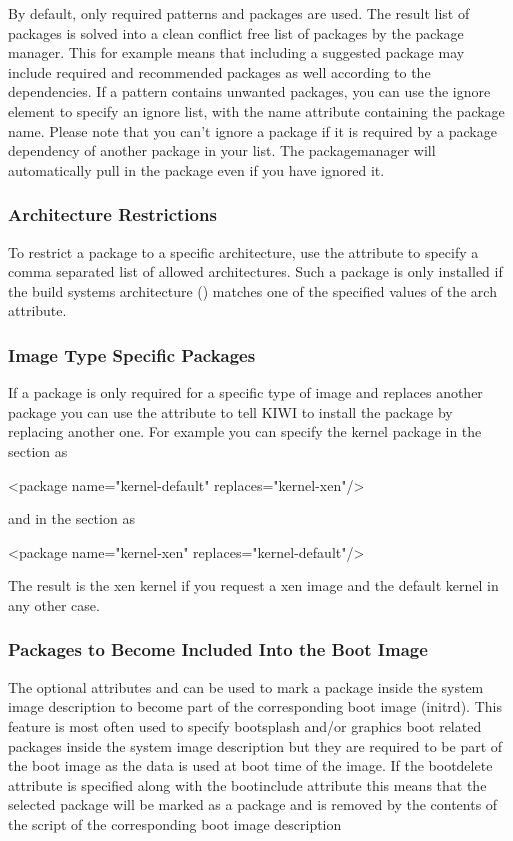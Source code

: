 By default, only required patterns and packages are used. The result
list of packages is solved into a clean conflict free list of packages
by the package manager. This for example means that including a suggested
package may include required and recommended packages as well according
to the dependencies. If a pattern contains unwanted packages, you can use
the ignore element to specify an ignore list, with the name attribute
containing the package name. Please note that you can't ignore a package
if it is required by a package dependency of another package in your list.
The packagemanager will automatically pull in the package even if you have
ignored it.

\subsubsection{Architecture Restrictions}
To restrict a package to a specific architecture, use
the  attribute to specify a comma separated list of allowed
architectures. Such a package is only installed if the build systems
architecture () matches one of the specified values of the arch
attribute.

\subsubsection{Image Type Specific Packages}
If a package is only required for a specific type of image
and replaces another package you can use the  attribute
to tell KIWI to install the package by replacing another one. For example
you can specify the kernel package in the  section as

\begin{xml}
<package name="kernel-default" replaces="kernel-xen"/>
\end{xml}

and in the  section as

\begin{xml}
<package name="kernel-xen" replaces="kernel-default"/>
\end{xml}

The result is the xen kernel if you request a xen image and the
default kernel in any other case.

\subsubsection{Packages to Become Included Into the Boot Image}
The optional attributes  and 
can be used to mark a package inside the system image description to
become part of the corresponding boot image (initrd). This feature
is most often used to specify bootsplash and/or graphics boot related
packages inside the system image description but they are required
to be part of the boot image as the data is used at boot time
of the image. If the bootdelete attribute is specified along with
the bootinclude attribute this means that the selected package
will be marked as a  package and is
removed by the contents of the  script of the corresponding
boot image description

